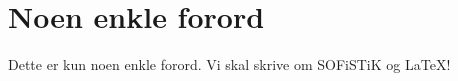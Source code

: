 \section{Noen enkle forord} \label{sec: forord}

Dette er kun noen enkle forord. 
Vi skal skrive om SOFiSTiK og \LaTeX!